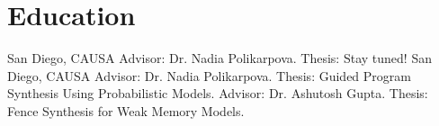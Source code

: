 \section{Education}
  {San Diego, CA}{USA}
    {Advisor: Dr. Nadia Polikarpova. Thesis: Stay tuned!}
%    
  {San Diego, CA}{USA}
  {Advisor: Dr. Nadia Polikarpova. Thesis: Guided Program Synthesis Using Probabilistic Models.}
%
  {Advisor: Dr. Ashutosh Gupta. Thesis: Fence Synthesis for Weak Memory Models.}
